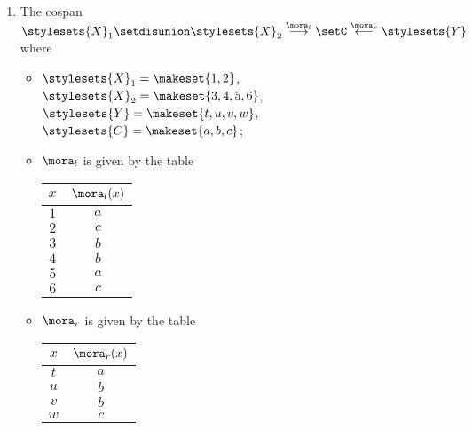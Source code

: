 \begin{gradedexercise}
\begin{enumerate}
\begin{itemize}
\begin{center}
\end{center}
\end{itemize}
\item The cospan $\stylesets{X}_1 \setdisunion \stylesets{X}_2 \overset{\mora_l}{\longrightarrow} \setC \overset{\mora_r}{\longleftarrow} \stylesets{Y}$ where
\begin{itemize}
\item $\stylesets{X}_1 = \makeset{1, 2}$, $\stylesets{X}_2 = \makeset{3, 4, 5, 6}$, $\stylesets{Y} = \makeset{t, u, v, w}$, $\stylesets{C} = \makeset{a, b, c}$;
\item $\mora_l$ is given by the table
\begin{center}
\begin{tabular}{c|c}
$x$ & $\mora_l(x)$\\
\hline
$1$ & $a$ \\
$2$ & $c$ \\
$3$ & $b$ \\
$4$ & $b$ \\
$5$ & $a$ \\
$6$ & $c$ 
\end{tabular}
\end{center}
\item $\mora_r$ is given by the table
\begin{center}
\begin{tabular}{c|c}
$x$ & $\mora_r(x)$\\
\hline
$t$ & $a$ \\
$u$ & $b$ \\
$v$ & $b$ \\
$w$ & $c$ 
\end{tabular}
\end{center}
\end{itemize}
\end{enumerate}

\end{gradedexercise}

